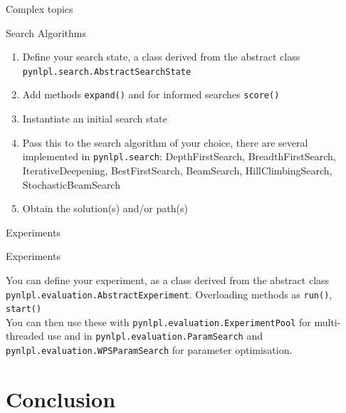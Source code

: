 \documentclass[compress]{beamer}
\begin{document}
\begin{frame}{Complex topics}

\begin{block}{Search Algorithms} 
\begin{enumerate}
 \item Define your search state, a class derived from the abstract class \texttt{pynlpl.search.AbstractSearchState}
 \item Add methods \texttt{expand()} and for informed searches \texttt{score()}
 \item Instantiate an initial search state
 \item Pass this to the search algorithm of your choice, there are several implemented in \texttt{pynlpl.search}: DepthFirstSearch, BreadthFirstSearch, IterativeDeepening, BestFirstSearch, BeamSearch, HillClimbingSearch, StochasticBeamSearch
 \item Obtain the solution(s) and/or path(s)
\end{enumerate}
\end{block}


\end{frame}


\begin{frame}{Experiments}

\begin{block}{Experiments} 

You can define your experiment, as a class derived from the abstract class \texttt{pynlpl.evaluation.AbstractExperiment}. Overloading methods as \texttt{run()}, \texttt{start()} \\


You can then use these with \texttt{pynlpl.evaluation.ExperimentPool} for multi-threaded use and in \texttt{pynlpl.evaluation.ParamSearch} and \texttt{pynlpl.evaluation.WPSParamSearch} for parameter optimisation.

\end{block}

\end{frame}

\section{Conclusion}
\end{document}
